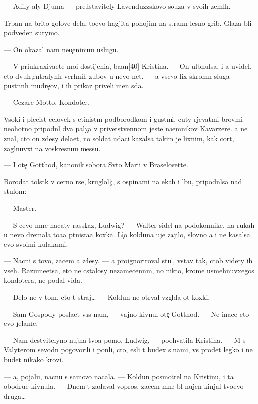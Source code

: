 \documentclass[10pt]{book}
\begin{document}
— Adily aly Djuma — predstavitely Lavenduzzskovo so{\y}uza v svo{\y}ih zeml{\ia}h.

T{\iu}rban na brito{\y} golove delal to{\x}evo hagjita pohojim na strann{\yi}{\y} lesno{\y} grib. Glaza b{\yi}li podveden{\yi} surymo{\y}.

— On okazal nam neo{\c}enimu{\y}u uslugu.

— V{\yi} priukraxiva{\y}ete mo{\y}i dostijeni{\y}a, ba{\y}an[40] Kristina. — On ul{\yi}bnulsa, i {\y}a uvidel, cto dvuh {\c}entralyn{\yi}h verhnih zubov u nevo net. — {\Y}a vsevo lix skromn{\yi}{\y} sluga pust{\yi}nn{\yi}h mudre{\c}ov, i ih prikaz{\yi} priveli men{\ia} s{\iu}da.

— Cezare Motto. Kondot{\y}er.

V{\yi}soki{\y} i plecist{\yi}{\y} celovek s {\x}etinist{\yi}m podborodkom i gust{\yi}mi, cuty r{\yi}jevat{\yi}mi brov{\ia}mi neohotno pripodn{\ia}l dva paly{\c}a v privetstvennom jeste na{\y}emnikov Kavarzere. {\Y}a ne znal, cto on zdesy dela{\y}et, no soldat udaci kazalsa takim je lixnim, kak cort, zagl{\ia}nuvxi{\y} na voskresnu{\y}u messu.

— I ote{\c} Gotthod, kanonik sobora Sv{\ia}to{\y} Mari{\y}i v Braselovette.

Borodat{\yi}{\y} tolst{\ia}k v cerno{\y} r{\ia}se, krugloli{\c}i{\y}, s ospinami na {\x}ekah i lbu, pripodn{\ia}lsa nad stulom:

— Master.

— S cevo mne nacaty rasskaz, Ludwig? — Walter sidel na podokonnike, na rukah u nevo dremala to{\x}a{\y}a p{\ia}tnista{\y}a koxka. Li{\c}o kolduna uje zajilo, slovno {\y}a i ne kasalsa {\y}evo svo{\y}imi kulakami.

— Nacni s tovo, zacem {\y}a zdesy. — {\Y}a proignoriroval stul, vstav tak, ctob{\yi} videty ih vseh. Razume{\y}etsa, eto ne ostalosy nezamecenn{\yi}m, no nikto, krome usmehnuvxegos{\ia} kondot{\y}era, ne podal vida.

— Delo ne v tom, cto t{\yi} straj… — Koldun ne otr{\yi}val vzgl{\ia}da ot koxki.

— Sam Gospody pos{\yi}la{\y}et vas nam, — vajno kivnul ote{\c} Gotthod. — Ne inace eto {\y}evo jelani{\y}e.

— Nam de{\y}stvitelyno nujna tvo{\y}a pomo{\x}, Ludwig, — podhvatila Kristina. — M{\yi} s Valyterom sevodn{\ia} pogovorili i pon{\ia}li, cto, {\y}esli t{\yi} budex s nami, vs{\e} pro{\y}det legko i ne budet nikako{\y} krovi.

— {\Y}a, pojalu{\y}, nacnu s samovo nacala. — Koldun posmotrel na Kristinu, i ta obodr{\ia}{\y}u{\x}e kivnula. — Dnem t{\yi} zadaval vopros, zacem mne b{\yi}l nujen kinjal tvo{\y}evo druga…
\end{document}
